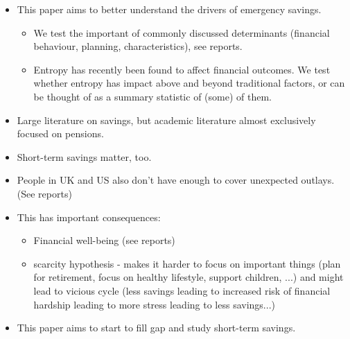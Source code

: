 

\begin{itemize}

    \item This paper aims to better understand the drivers of emergency
        savings. 

        \begin{itemize}
            \item We test the important of commonly discussed determinants
                (financial behaviour, planning, characteristics), see reports.

            \item Entropy has recently been found to affect financial outcomes.
                We test whether entropy has impact above and beyond traditional
                factors, or can be thought of as a summary statistic of (some)
                of them.
        \end{itemize}




    \item Large literature on savings, but academic literature almost
        exclusively focused on pensions.

    \item Short-term savings matter, too. 

    \item People in UK and US also don't have enough to cover unexpected
        outlays. (See reports)

    \item This has important consequences:

        \begin{itemize}
            \item Financial well-being (see reports)

            \item scarcity hypothesis - makes it harder to focus on important
                things (plan for retirement, focus on healthy lifestyle,
                support children, ...) and might lead to vicious cycle (less
                savings leading to increased risk of financial hardship leading
                to more stress leading to less savings...)
        \end{itemize}

    \item This paper aims to start to fill gap and study short-term savings.




\end{itemize}
